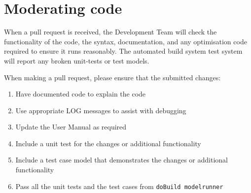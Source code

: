 \section{Moderating code\label{sec:Maintaining}}

When a pull request is received, the Development Team will check the functionality of the code, the syntax, documentation, and any optimisation code required to ensure it runs reasonably. The automated build system test system will report any broken unit-tests or test models. 

When making a pull request, please ensure that the submitted changes:

\begin{enumerate}
	\item Have documented code to explain the code
	\item Use appropriate LOG messages to assist with debugging
	\item Update the User Manual as required
	\item Include a unit test for the changes or additional functionality
	\item Include a test case model that demonstrates the changes or additional functionality
	\item Pass all the unit tests and the test cases from \texttt{doBuild modelrunner}
\end{enumerate}
